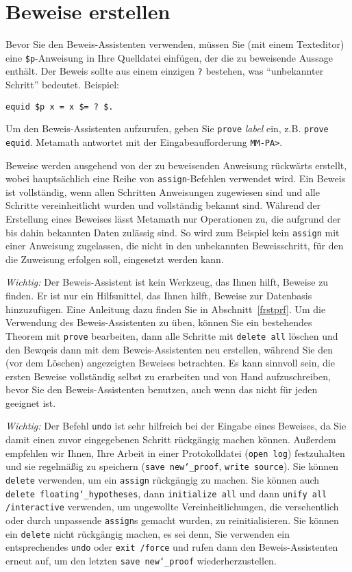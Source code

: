 \section{Beweise erstellen}\label{pfcommands}

Bevor Sie den Beweis-Assistenten verwenden, müssen Sie (mit einem Texteditor) eine \texttt{\$p}-Anweisung in Ihre Quelldatei einfügen, der die zu beweisende Aussage enthält.  Der Beweis sollte aus einem einzigen \texttt{?} bestehen, was "`unbekannter Schritt"' bedeutet.  Beispiel:
\begin{verbatim}
equid $p x = x $= ? $.
\end{verbatim}

Um den Beweis-Assistenten aufzurufen, geben Sie \texttt{prove} {\em label} ein, z.B. \texttt{prove equid}.  Metamath antwortet mit der Eingabeaufforderung \texttt{MM-PA>}.

Beweise werden ausgehend von der zu beweisenden Anweisung rückwärts erstellt, wobei hauptsächlich eine Reihe von \texttt{assign}-Befehlen verwendet wird.  Ein Beweis ist vollständig, wenn allen Schritten Anweisungen zugewiesen sind und alle Schritte vereinheitlicht wurden und vollständig bekannt sind.  Während der Erstellung eines Beweises lässt Metamath nur Operationen zu, die aufgrund der bis dahin bekannten Daten zulässig sind.  So wird zum Beispiel kein \texttt{assign} mit einer Anweisung zugelassen, die nicht in den unbekannten Beweisschritt, für den die Zuweisung erfolgen soll, eingesetzt werden kann. 

{\em Wichtig:} Der Beweis-Assistent ist kein Werkzeug, das Ihnen hilft, Beweise zu finden.  Er ist nur ein Hilfsmittel, das Ihnen hilft, Beweise zur Datenbasis hinzuzufügen.  Eine Anleitung dazu finden Sie in Abschnitt~\ref{frstprf}. Um die Verwendung des Beweis-Assistenten zu üben, können Sie ein bestehendes Theorem mit  \texttt{prove} bearbeiten, dann alle Schritte mit \texttt{delete all} löschen und den Bewqeis dann mit dem Beweis-Assistenten neu erstellen, während Sie den (vor dem Löschen) angezeigten Beweises betrachten. Es kann sinnvoll sein, die ersten Beweise vollständig selbst zu erarbeiten und von Hand aufzuschreiben, bevor Sie den Beweis-Assistenten benutzen, auch wenn das nicht für jeden geeignet ist. 

{\em Wichtig:} Der Befehl \texttt{undo} ist sehr hilfreich bei der Eingabe eines Beweises, da Sie damit einen zuvor eingegebenen Schritt rückgängig machen können. Außerdem empfehlen wir Ihnen, Ihre Arbeit in einer Protokolldatei (\texttt{open log}) festzuhalten und sie regelmäßig zu speichern (\texttt{save new{\char`\_}proof}, \texttt{write source}). Sie können \texttt{delete} verwenden, um ein \texttt{assign} rückgängig zu machen. Sie können auch \texttt{delete floating{\char`\_}hypotheses}, dann \texttt{initialize all} und dann \texttt{unify all /interactive} verwenden, um ungewollte Vereinheitlichungen, die versehentlich oder durch unpassende \texttt{assign}s gemacht wurden, zu reinitialisieren.  Sie können ein \texttt{delete} nicht rückgängig machen, es sei denn, Sie verwenden ein entsprechendes \texttt{undo} oder \texttt{exit /force} und rufen dann den Beweis-Assistenten erneut auf, um den letzten \texttt{save new{\char`\_}proof} wiederherzustellen.

